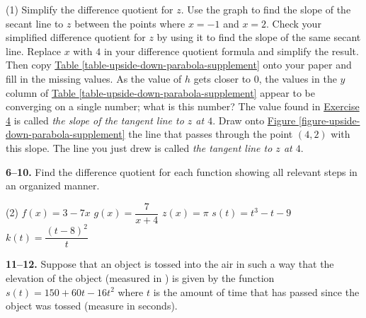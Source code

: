 \documentclass[10pt,oneside,]{book}
\theoremstyle{plain}
\theoremstyle{definition}
\numberwithin{equation}{section}
\newcommand{\fe}[2]{#1\mathopen{}\left(#2\right)\mathclose{}}
\newcommand{\point}[2]{\left(#1,#2\right)}
\begin{document}
\begin{exercisegroup}(1)
\exercise[1.]\hypertarget{exercise-30}{\null}Simplify the difference quotient for \(z\).%
\exercise[2.]\hypertarget{exercise-31}{\null}Use the graph to find the slope of the secant line to \(z\) between the points where \(x=-1\) and \(x=2\).  Check your simplified difference quotient for \(z\) by using it to find the slope of the same secant line.%
\exercise[3.]\hypertarget{exercise-32}{\null}Replace \(x\) with \(4\) in your difference quotient formula and simplify the result.  Then copy \hyperref[table-upside-down-parabola-supplement]{Table \ref{table-upside-down-parabola-supplement}} onto your paper and fill in the missing values.%
\exercise[4.]\hypertarget{exercise-upside-down-parabola-slope}{\null}As the value of \(h\) gets closer to \(0\), the values in the \(y\) column of \hyperref[table-upside-down-parabola-supplement]{Table \ref{table-upside-down-parabola-supplement}} appear to be converging on a single number; what is this number?%
\exercise[5.]\hypertarget{exercise-34}{\null}The value found in \hyperlink{exercise-upside-down-parabola-slope}{Exercise 4} is called \emph{the slope of the tangent line to \(z\) at \(4\)}.  Draw onto \hyperref[figure-upside-down-parabola-supplement]{Figure \ref{figure-upside-down-parabola-supplement}} the line that passes through the point \(\point{4}{2}\) with this slope.  The line you just drew is called \emph{the tangent line to \(z\) at \(4\)}.%
\end{exercisegroup}
\par\smallskip\noindent
\textbf{6--10. }\hypertarget{exercisegroup-10}{\null}Find the difference quotient for each function showing all relevant steps in an organized manner.%
\par
\begin{exercisegroup}(2)
\exercise[6.]\hypertarget{exercise-35}{\null}\(\fe{f}{x}=3-7x\)%
\exercise[7.]\hypertarget{exercise-36}{\null}\(\fe{g}{x}=\dfrac{7}{x+4}\)%
\exercise[8.]\hypertarget{exercise-37}{\null}\(\fe{z}{x}=\pi\)%
\exercise[9.]\hypertarget{exercise-38}{\null}\(\fe{s}{t}=t^3-t-9\)%
\exercise[10.]\hypertarget{exercise-39}{\null}\(\fe{k}{t}=\dfrac{(t-8)^2}{t}\)%
\end{exercisegroup}
\par\smallskip\noindent
\textbf{11--12. }\hypertarget{exercisegroup-11}{\null}Suppose that an object is tossed into the air in such a way that the elevation of the object (measured in \si{\foot}) is given by the function \(\fe{s}{t}=150+60t-16t^2\) where \(t\) is the amount of time that has passed since the object was tossed (measure in seconds).%
\end{document}
